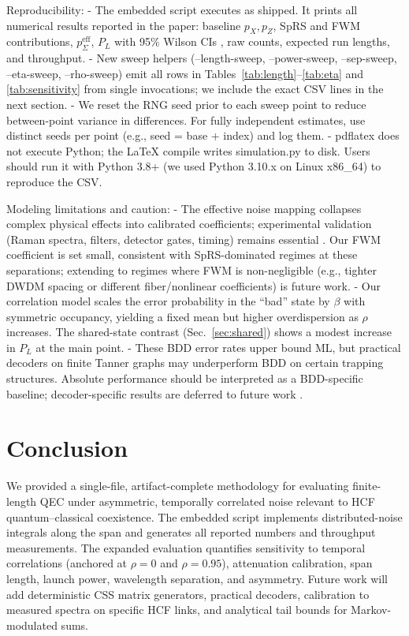 \documentclass[conference]{IEEEtran}
\begin{document}
Reproducibility:
- The embedded script executes as shipped. It prints all numerical results reported in the paper: baseline \(p_X,p_Z\), SpRS and FWM contributions, \(p_\Sigma^{\mathrm{eff}}\), \(P_L\) with 95\% Wilson CIs \cite{Wilson1927JASA}, raw counts, expected run lengths, and throughput.
- New sweep helpers (--length-sweep, --power-sweep, --sep-sweep, --eta-sweep, --rho-sweep) emit all rows in Tables~\ref{tab:length}--\ref{tab:eta} and \ref{tab:sensitivity} from single invocations; we include the exact CSV lines in the next section.
- We reset the RNG seed prior to each sweep point to reduce between-point variance in differences. For fully independent estimates, use distinct seeds per point (e.g., seed = base + index) and log them.
- pdflatex does not execute Python; the LaTeX compile writes simulation.py to disk. Users should run it with Python 3.8+ (we used Python 3.10.x on Linux x86\_64) to reproduce the CSV.

Modeling limitations and caution:
- The effective noise mapping collapses complex physical effects into calibrated coefficients; experimental validation (Raman spectra, filters, detector gates, timing) remains essential \cite{Eraerds2010NJP,Patel2012PRX,Kumar2015NJP}. Our FWM coefficient is set small, consistent with SpRS-dominated regimes at these separations; extending to regimes where FWM is non-negligible (e.g., tighter DWDM spacing or different fiber/nonlinear coefficients) is future work.
- Our correlation model scales the error probability in the “bad” state by \(\beta\) with symmetric occupancy, yielding a fixed mean but higher overdispersion as \(\rho\) increases. The shared-state contrast (Sec.~\ref{sec:shared}) shows a modest increase in \(P_L\) at the main point.
- These BDD error rates upper bound ML, but practical decoders on finite Tanner graphs may underperform BDD on certain trapping structures. Absolute performance should be interpreted as a BDD-specific baseline; decoder-specific results are deferred to future work \cite{Higgott2021PyMatching,Cross2007arXiv}.

\section{Conclusion}
We provided a single-file, artifact-complete methodology for evaluating finite-length QEC under asymmetric, temporally correlated noise relevant to HCF quantum--classical coexistence. The embedded script implements distributed-noise integrals along the span and generates all reported numbers and throughput measurements. The expanded evaluation quantifies sensitivity to temporal correlations (anchored at \(\rho=0\) and \(\rho=0.95\)), attenuation calibration, span length, launch power, wavelength separation, and asymmetry. Future work will add deterministic CSS matrix generators, practical decoders, calibration to measured spectra on specific HCF links, and analytical tail bounds for Markov-modulated sums.
\end{document}
